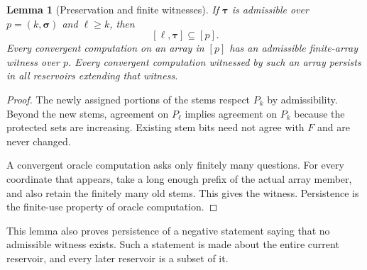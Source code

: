 \documentclass[11pt,letterpaper]{article}
\newtheorem{lemma}[theorem]{Lemma}
\theoremstyle{definition}
\theoremstyle{remark}\newtheorem{remark}[theorem]{Remark}
\numberwithin{equation}{section}
\begin{document}
\begin{lemma}[Preservation and finite witnesses]\label{cr13:lem:preserve}
If $\boldsymbol\tau$ is admissible over $p=(k,\boldsymbol\sigma)$ and $\ell\ge k$, then
\[
                      [\ell,\boldsymbol\tau]\subseteq[p].
\]
Every convergent computation on an array in $[p]$ has an admissible finite-array witness over $p$. Every convergent computation witnessed by such an array persists in all reservoirs extending that witness.
\end{lemma}
\begin{proof}
The newly assigned portions of the stems respect $P_k$ by admissibility. Beyond the new stems, agreement on $P_\ell$ implies agreement on $P_k$ because the protected sets are increasing. Existing stem bits need not agree with $F$ and are never changed.

A convergent oracle computation asks only finitely many questions. For every coordinate that appears, take a long enough prefix of the actual array member, and also retain the finitely many old stems. This gives the witness. Persistence is the finite-use property of oracle computation.
\end{proof}
This lemma also proves persistence of a negative statement saying that no admissible witness exists. Such a statement is made about the entire current reservoir, and every later reservoir is a subset of it.
\end{document}
